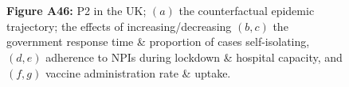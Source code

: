 \documentclass[paper=a4,fontsize=11pt]{article}
\begin{document}
\begin{figure}[!h]
  \\
  \hspace{1.76cm}
  \\
  \caption*{\textbf{Figure A46:} P2 in the UK; $(a)$ the counterfactual epidemic trajectory; the effects of increasing/decreasing $(b,c)$ the government response time \& proportion of cases self-isolating, $(d,e)$ adherence to NPIs during lockdown \& hospital capacity, and $(f,g)$ vaccine administration rate \& uptake.}
\end{figure}
\end{document}
